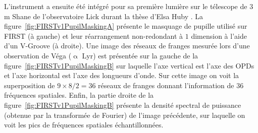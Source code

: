 L'instrument a ensuite été intégré pour sa première lumière \citep{huby2012} sur le télescope de $3 \,$m Shane de l'observatoire Lick durant la thèse d'Elsa Huby \citep{huby2013these}. La figure~\ref{fig:FIRSTv1PupilMaskingA} présente le masquage de pupille utilisé sur \ac{FIRST} (à gauche) et leur réarrangement non-redondant à $1$ dimension à l'aide d'un V-Groove (à droite). Une image des réseaux de franges mesurée lors d'une observation de Véga ($\upalpha$ Lyr) est présentée sur la gauche de la figure~\ref{fig:FIRSTv1PupilMaskingB} sur laquelle l'axe vertical est l'axe des \ac{OPD}s et l'axe horizontal est l'axe des longueurs d'onde. Sur cette image on voit la superposition de $9 \times 8 / 2 = 36$ réseaux de franges donnant l'information de $36$ fréquences spatiales. Enfin, la partie droite de la figure~\ref{fig:FIRSTv1PupilMaskingB} présente la densité spectral de puissance (obtenue par la transformée de Fourier) de l'image précédente, sur laquelle on voit les pics de fréquences spatiales échantillonnées.

